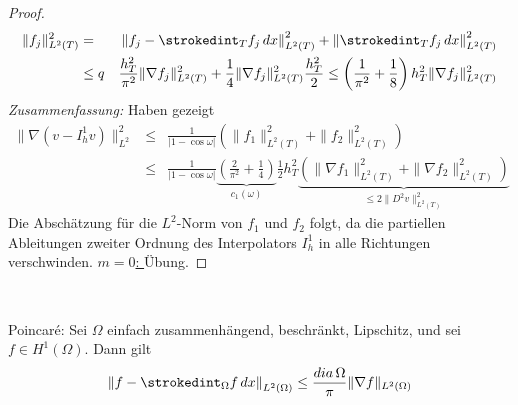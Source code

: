 \documentclass[../skript.tex]{subfiles}
\begin{document}
\begin{proof}
\[	\]
	\begin{eqnarray*}
			\| f_j\|_{L^2(T)}^2 
		&=& 
			\left\| f_j - \strokedint_T f_j\,dx \right\|_{L^2(T)}^2 + \left\|\strokedint_T f_j\,dx\right\|_{L^2(T)}^2\\
		&\le q& 
			\frac{h_T^2}{\pi^2} \|\nabla f_j\|_{L^2(T)}^2 + \frac{1}{4}\|\nabla f_j\|_{L^2(T)}^2 \frac{h_T^2}{2}
		\leq
			\left( \frac{1}{\pi^2}+\frac{1}{8} \right)h_T^2 \|\nabla f_j\|_{L^2(T)}^2
	\end{eqnarray*}
	\emph{Zusammenfassung:} Haben gezeigt
	\begin{eqnarray*}
			\|\nabla (v-I_h^1 v)\|_{L^2}^2 
		&\leq& 
			\frac{1}{\vert 1-\cos{\omega}\vert}\left( \|f_1\|_{L^2(T)}^2 + \| f_2\|_{L^2(T)}^2 \right)\\
		&\leq& 
			\frac{1}{\vert 1-\cos{\omega}\vert}\underbrace{\left(\frac{2}{\pi^2} + \frac{1}{4}\right)}_{c_1(\omega)} \frac{1}{2} h_T^2 \underbrace{\left( \|\nabla f_1\|_{L^2(T)}^2 + \|\nabla f_2\|_{L^2(T)}^2 \right)}_{\leq 2\|D^2v\|_{L^2(T)}^2}
	\end{eqnarray*}
	Die Abschätzung für die $L^2$-Norm von $f_1$ und $f_2$ folgt, da die partiellen Ableitungen zweiter Ordnung des Interpolators $I_h^1$ in alle Richtungen verschwinden.\newline\newline\noindent
	\underline{$m=0$: } Übung.
\end{proof}
\ \\

\begin{remark*}
	Poincaré: Sei $\Omega$ einfach zusammenhängend, beschränkt, Lipschitz, und sei $f\in H^1(\Omega)$. Dann gilt
	\[
		\left\| f-\strokedint_\Omega f\,dx\right\|_{L^2(\Omega)}\leq\frac{dia\,\Omega}{\pi}\|\nabla f\|_{L^2(\Omega)}
	\]
\end{remark*}
\end{document}
